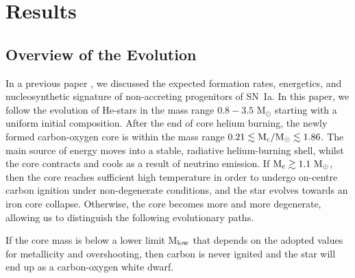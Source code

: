 \documentclass[../../main/thesis_msc.tex]{subfiles}
\begin{document}
\section{Results} \label{sec:results}

    \subsection{Overview of the Evolution} \label{sec:overview}
    In a previous paper \citep[][hereafter Paper\, I]{Antoniadis2019}, we discussed the expected formation rates, energetics, and nucleosynthetic signature of non-accreting progenitors of SN\, Ia. In this paper, we follow the evolution of He-stars in the mass range $0.8 - 3.5$ M$_{\odot}$ starting with a uniform initial composition. After the end of core helium burning, the newly formed carbon-oxygen core is within the mass range $0.21 \lesssim \rm M_c/M_{\odot} \lesssim 1.86$. The main source of energy moves into a stable, radiative helium-burning shell, whilst the core contracts and cools as a result of neutrino emission. If $\rm M_c  \gtrsim 1.1 \ M_{\odot}$, then the core reaches sufficient high temperature in order to undergo on-centre carbon ignition under non-degenerate conditions, and the star evolves towards an iron core collapse. Otherwise, the core becomes more and more degenerate, allowing us to distinguish the following evolutionary paths.
    

    If the core mass is below a lower limit M$_{\rm low}$ that depends on the adopted values for metallicity and overshooting, then carbon is never ignited and the star will end up as a carbon-oxygen white dwarf. 
    
\end{document}
